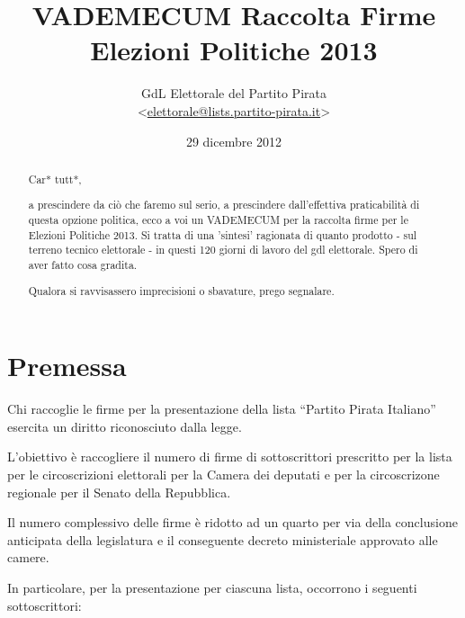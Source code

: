 \documentclass[paper=a4,11pt]{scrartcl}
\title{VADEMECUM Raccolta Firme\\ Elezioni Politiche 2013}
\author{GdL Elettorale del Partito Pirata\\<\href{mailto:elettorale@lists.partito-pirata.it}{elettorale@lists.partito-pirata.it}>}
\date{29 dicembre 2012}
\begin{document}
\maketitle
\begin{abstract}
Car* tutt*,

a prescindere da ciò che faremo sul serio, a prescindere dall'effettiva 
praticabilità di questa opzione politica, ecco a voi un VADEMECUM per la 
raccolta firme per le Elezioni Politiche 2013. Si tratta di una 'sintesi' 
ragionata di quanto prodotto - sul terreno tecnico elettorale - in questi 120 
giorni di lavoro del gdl elettorale. Spero di aver fatto cosa gradita. 

Qualora si ravvisassero imprecisioni o sbavature, prego segnalare.
\end{abstract}

\tableofcontents

\section{Premessa}
Chi raccoglie le firme per la presentazione della lista “Partito Pirata 
Italiano” esercita un diritto riconosciuto dalla legge. 

L'obiettivo è raccogliere il numero di firme di sottoscrittori prescritto per 
la lista per le circoscrizioni elettorali per la Camera dei deputati e per la 
circoscrizone regionale per il Senato della Repubblica.

Il numero complessivo delle firme è ridotto ad un quarto per via della 
conclusione anticipata della legislatura e il conseguente decreto ministeriale 
approvato alle camere.

In particolare, per la presentazione per ciascuna lista, occorrono i seguenti 
sottoscrittori:
\end{document}
